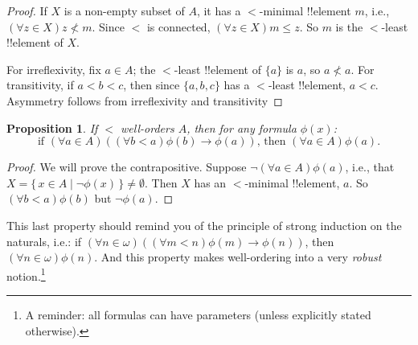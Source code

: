 \documentclass[10pt,a4paper]{article}
\theoremstyle{plain}
\newtheorem{prop}[thm]{Proposition}
\theoremstyle{definition}
\theoremstyle{remark}
\newcommand*{\ollabel}[1]{\label{#1}}
\providecommand{\lif}{\mathbin{\rightarrow}}
\providecommand{\Setabs}[2]{\{\, #1 \mid #2 \,\}}
\begin{document}
\begin{proof}
If $X$ is a non-empty subset of $A$, it has a $<$-minimal !!{element}
$m$, i.e., $(\forall z \in X)z \nless m$. Since $<$ is connected,
$(\forall z \in X)m \leq z$. So $m$ is the $<$-least !!{element} of $X$.

For irreflexivity, fix $a \in A$; the $<$-least !!{element} of $\{a\}$ is $a$, so $a \nless a$. For transitivity, if $a < b < c$, then
since $\{a, b, c\}$ has a $<$-least !!{element}, $a < c$. Asymmetry
follows from irreflexivity and transitivity
\end{proof}

\begin{prop}\ollabel{propwoinduction}
If $<$ well-orders $A$, then for any formula $\phi(x)$:
\[
	\text{if }(\forall a \in A)((\forall b < a)\phi(b) \lif 
		\phi(a))\text{, then }(\forall a \in A)\phi(a).
\]
\end{prop}

\begin{proof}
We will prove the contrapositive. Suppose $\lnot(\forall a \in
A)\phi(a)$, i.e., that $X = \Setabs{x \in A}{\lnot\phi(x)} \neq
\emptyset$. Then $X$ has an $<$-minimal !!{element}, $a$. So $(\forall
b < a)\phi(b)$ but $\lnot \phi(a)$. \end{proof}\noindent This last
property should remind you of the principle of strong induction on the
naturals, i.e.: if $(\forall n \in \omega)((\forall m < n)\phi(m)
\lif \phi(n))$, then $(\forall n \in \omega)\phi(n)$. And this
property makes well-ordering into a very \emph{robust} notion.\footnote{A reminder: all formulas can have parameters (unless explicitly stated otherwise).} 
\end{document}

